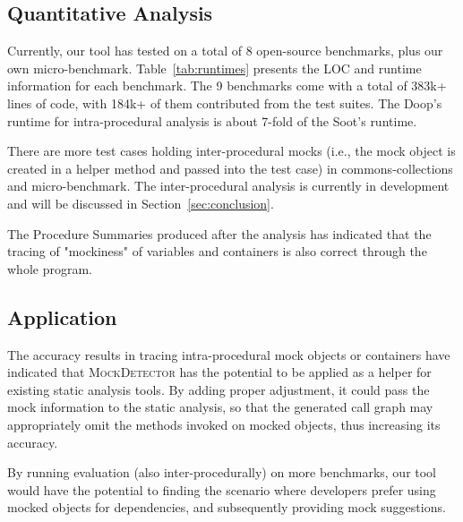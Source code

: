\subsection{Quantitative Analysis}
\label{subsec:effectiveness}

Currently, our tool has tested on a total of 8 open-source benchmarks, plus our own micro-benchmark. Table~\ref{tab:runtimes} presents the LOC and runtime information for each benchmark. The 9 benchmarks come with a total of 383k+ lines of code, with 184k+ of them contributed from the test suites. The Doop's runtime for intra-procedural analysis is about 7-fold of the Soot's runtime. %


There are more test cases holding inter-procedural mocks (i.e., the mock object is created in a helper method and passed into the test case) in commons-collections and micro-benchmark. The inter-procedural analysis is currently in development and will be discussed in Section~\ref{sec:conclusion}.

The Procedure Summaries produced after the analysis has indicated that the tracing of "mockiness" of variables and containers is also correct through the whole program. 

\subsection{Application}
\label{subsec:static}

The accuracy results in tracing intra-procedural mock objects or containers have indicated that \textsc{MockDetector} has the potential to be applied as a helper for existing static analysis tools. By adding proper adjustment, it could pass the mock information to the static analysis, so that the generated call graph may appropriately omit the methods invoked on mocked objects, thus increasing its accuracy.

By running evaluation (also inter-procedurally) on more benchmarks, our tool would have the potential to finding the scenario where developers prefer using mocked objects for dependencies, and subsequently providing mock suggestions.